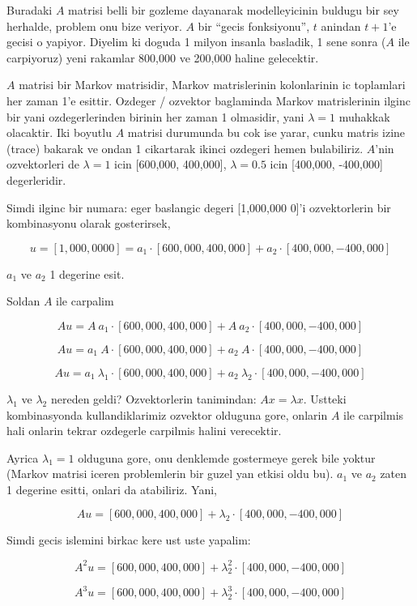 \documentclass[12pt,fleqn]{article}\usepackage{../common}
\begin{document}
Buradaki $A$ matrisi belli bir gozleme dayanarak modelleyicinin buldugu bir
sey herhalde, problem onu bize veriyor. $A$ bir ``gecis fonksiyonu'', $t$
anindan $t+1$'e gecisi o yapiyor. Diyelim ki doguda 1 milyon insanla
basladik, 1 sene sonra ($A$ ile carpiyoruz) yeni rakamlar 800,000 ve
200,000 haline gelecektir. 

$A$ matrisi bir Markov matrisidir, Markov matrislerinin kolonlarinin ic
toplamlari her zaman 1'e esittir. Ozdeger / ozvektor baglaminda Markov
matrislerinin ilginc bir yani ozdegerlerinden birinin her zaman 1
olmasidir, yani $\lambda = 1$ muhakkak olacaktir. Iki boyutlu $A$ matrisi
durumunda bu cok ise yarar, cunku matris izine (trace) bakarak ve ondan 1
cikartarak ikinci ozdegeri hemen bulabiliriz. $A$'nin ozvektorleri de
$\lambda = 1$ icin [600,000, 400,000], $\lambda = 0.5$ icin [400,000, -400,000]
degerleridir. 

Simdi ilginc bir numara: eger baslangic degeri [1,000,000 0]'i ozvektorlerin
bir kombinasyonu olarak gosterirsek,

\[ u = [1,000,000 0] = 
a_1 \cdot [600,000, 400,000] + 
a_2 \cdot [400,000, -400,000] \]

$a_1$ ve $a_2$ 1 degerine esit. 

Soldan $A$ ile carpalim

\[ Au = 
A \ a_1 \cdot [600,000, 400,000] + 
A \ a_2 \cdot [400,000, -400,000] \]

\[ Au = 
 a_1 \ A \cdot [600,000, 400,000] + 
 a_2 \ A \cdot [400,000, -400,000] \]

\[ Au = 
a_1 \ \lambda_1 \cdot [600,000, 400,000] + 
a_2 \ \lambda_2 \cdot [400,000, -400,000] \]

$\lambda_1$ ve $\lambda_2$ nereden geldi? Ozvektorlerin tanimindan: $Ax =
\lambda x$. Ustteki 
kombinasyonda kullandiklarimiz ozvektor olduguna gore, onlarin $A$ ile
carpilmis hali onlarin tekrar ozdegerle carpilmis halini verecektir. 

Ayrica $\lambda_1=1$ olduguna gore, onu denklemde gostermeye gerek bile
yoktur (Markov matrisi iceren problemlerin bir guzel yan etkisi oldu
bu). $a_1$ ve $a_2$ zaten 1 degerine esitti, onlari da atabiliriz. Yani,

\[ Au = 
[600,000, 400,000] + 
\lambda_2 \cdot [400,000, -400,000] \]

Simdi gecis islemini birkac kere ust uste yapalim:

\[ A^2u = 
[600,000, 400,000] + 
\lambda_2^2 \cdot [400,000, -400,000] \]

\[ A^3u = 
[600,000, 400,000] + 
\lambda_2^3 \cdot [400,000, -400,000] \]
\end{document}
